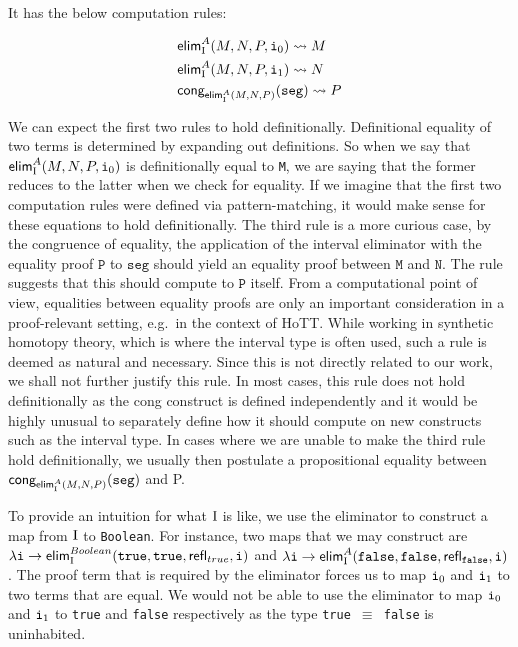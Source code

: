 \documentclass[12pt,twoside,maitrise]{dms}
\theoremstyle{definition}
\numberwithin{equation}{section}
\numberwithin{table}{chapter}
\numberwithin{figure}{chapter}
\newcommand\kw[1] {\textsf{#1}}
\newcommand\id[1] {\texttt{#1}}
\newcommand\fn[1] {\texttt{#1}}
\begin{document}
\begin{prooftree*}
   \infer3{\oftype{\ctx, \oftype{i}{\bI}}{\kw{elim}_{\bI}^{A} (M, N, P, i)}{A}}
\end{prooftree*}

It has the below computation rules:

\begin{align*}
  & \kw{elim}_{\bI}^{A}(M, N, P, \ileft) \rightsquigarrow{} M \\
  & \kw{elim}_{\bI}^{A}(M, N, P, \iright) \rightsquigarrow{} N \\
  & \kw{cong}_{\kw{elim}_{\bI}^{A}(M, N, P)}(\id{seg}) \rightsquigarrow{} P
\end{align*}

We can expect the first two rules to hold definitionally. Definitional equality
of two terms is determined by expanding out definitions. So when we say that
$\kw{elim}_{\bI}^{A}(M, N , P, \ileft)$ is definitionally equal to \id{M}, we
are saying that the former reduces to the latter when we check for equality. If
we imagine that the first two computation rules were defined via
pattern-matching, it would make sense for these equations to hold
definitionally. The third rule is a more curious case, by the congruence of
equality, the application of the interval eliminator with the equality proof
$\id{P}$ to $\id{seg}$ should yield an equality proof between $\id{M}$ and
$\id{N}$. The rule suggests that this should compute to $\id{P}$ itself. From a
computational point of view, equalities between equality proofs are only an
important consideration in a proof-relevant setting, e.g.\ in the context of
HoTT\@. While working in synthetic homotopy theory, which is where the interval
type is often used, such a rule is deemed as natural and necessary. Since this
is not directly related to our work, we shall not further justify this rule. In
most cases, this rule does not hold definitionally as the \kw{cong} construct is
defined independently and it would be highly unusual to separately define how it
should compute on new constructs such as the interval type. In cases where we
are unable to make the third rule hold definitionally, we usually then postulate
a propositional equality between $\kw{cong}_{\kw{elim}_{\bI}^{A}(M, N,
  P)}(\id{seg})$ and P.

To provide an intuition for what $\mathrm{I}$ is like, we use the eliminator to
construct a map from $\mathrm{I}$ to \id{Boolean}. For instance, two maps that we may
construct are $\lambda \id{i} \rightarrow \kw{elim}_{\bI}^{Boolean}(\id{true},
\id{true}, \kw{refl}_{true}, \id{i})$ and $\lambda \id{i} \rightarrow
\kw{elim}_{\bI}^{A}(\id{false}, \id{false}, \kw{refl}_{\id{false}}, \id{i})$.
The proof term that is required by the eliminator forces us to map $\ileft$ and
$\iright$ to two terms that are equal. We would not be able to use the
eliminator to map $\ileft$ and $\iright$ to \id{true} and \id{false}
respectively as the type \fn{true $\equiv$ false} is uninhabited.
\end{document}
